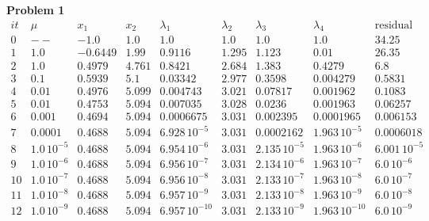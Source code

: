 \documentclass{article}
\begin{document}
\textbf{Problem 1}
\[
\begin{array}{ccccccccc} 
it & \mu & x_1 & x_2 & \lambda_1 & \lambda_2 & \lambda_3 & \lambda_4 & \text{residual}\\
\hline
0 & -- & -1.0 & 1.0 & 1.0 & 1.0 & 1.0 & 1.0 & 34.25\\ 1 & 1.0 & -0.6449 & 1.99 & 0.9116 & 1.295 & 1.123 & 0.01 & 26.35\\ 2 & 1.0 & 0.4979 & 4.761 & 0.8421 & 2.684 & 1.383 & 0.4279 & 6.8\\ 3 & 0.1 & 0.5939 & 5.1 & 0.03342 & 2.977 & 0.3598 & 0.004279 & 0.5831\\ 4 & 0.01 & 0.4976 & 5.099 & 0.004743 & 3.021 & 0.07817 & 0.001962 & 0.1083\\ 5 & 0.01 & 0.4753 & 5.094 & 0.007035 & 3.028 & 0.0236 & 0.001963 & 0.06257\\ 6 & 0.001 & 0.4694 & 5.094 & 0.0006675 & 3.031 & 0.002395 & 0.0001965 & 0.006153\\ 7 & 0.0001 & 0.4688 & 5.094 & 6.928\,{10}^{-5} & 3.031 & 0.0002162 & 1.963\,{10}^{-5} & 0.0006018\\ 8 & 1.0\,{10}^{-5} & 0.4688 & 5.094 & 6.954\,{10}^{-6} & 3.031 & 2.135\,{10}^{-5} & 1.963\,{10}^{-6} & 6.001\,{10}^{-5}\\ 9 & 1.0\,{10}^{-6} & 0.4688 & 5.094 & 6.956\,{10}^{-7} & 3.031 & 2.134\,{10}^{-6} & 1.963\,{10}^{-7} & 6.0\,{10}^{-6}\\ 10 & 1.0\,{10}^{-7} & 0.4688 & 5.094 & 6.956\,{10}^{-8} & 3.031 & 2.133\,{10}^{-7} & 1.963\,{10}^{-8} & 6.0\,{10}^{-7}\\ 11 & 1.0\,{10}^{-8} & 0.4688 & 5.094 & 6.957\,{10}^{-9} & 3.031 & 2.133\,{10}^{-8} & 1.963\,{10}^{-9} & 6.0\,{10}^{-8}\\ 12 & 1.0\,{10}^{-9} & 0.4688 & 5.094 & 6.957\,{10}^{-10} & 3.031 & 2.133\,{10}^{-9} & 1.963\,{10}^{-10} & 6.0\,{10}^{-9} \end{array}
\]
\end{document}
